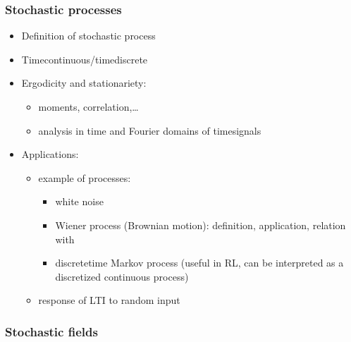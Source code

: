 \documentclass[letterpaper,10pt,english]{jupyterBook}
\begin{document}
\subsubsection*{Stochastic processes}
\begin{itemize}
\item {} 
\sphinxAtStartPar
Definition of stochastic process

\item {} 
\sphinxAtStartPar
Time\sphinxhyphen{}continuous/time\sphinxhyphen{}discrete

\item {} 
\sphinxAtStartPar
Ergodicity and stationariety:
\begin{itemize}
\item {} 
\sphinxAtStartPar
moments, correlation,…

\item {} 
\sphinxAtStartPar
analysis in time and Fourier domains of time\sphinxhyphen{}signals

\end{itemize}

\item {} 
\sphinxAtStartPar
Applications:
\begin{itemize}
\item {} 
\sphinxAtStartPar
example of processes:
\begin{itemize}
\item {} 
\sphinxAtStartPar
white noise

\item {} 
\sphinxAtStartPar
Wiener process (Brownian motion): definition, application, relation with

\item {} 
\sphinxAtStartPar
discrete\sphinxhyphen{}time Markov process (useful in RL, can be interpreted as a discretized continuous process)

\end{itemize}

\item {} 
\sphinxAtStartPar
response of LTI to random input

\end{itemize}

\end{itemize}
\subsubsection*{Stochastic fields}

\sphinxstepscope
\end{document}
